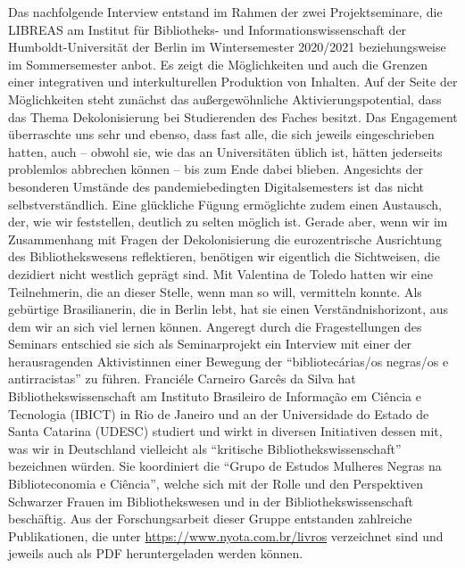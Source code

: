 \documentclass[a4paper,
fontsize=11pt,
oneside,
numbers=noperiodatend,
parskip=half-,
bibliography=totoc,
final
]{scrartcl}
\begin{document}
Das nachfolgende Interview entstand im Rahmen der zwei Projektseminare,
die LIBREAS am Institut für Bibliotheks- und Informationswissenschaft
der Humboldt-Universität der Berlin im Wintersemester 2020/2021
beziehungsweise im Sommersemester anbot. Es zeigt die Möglichkeiten und
auch die Grenzen einer integrativen und interkulturellen Produktion von
Inhalten. Auf der Seite der Möglichkeiten steht zunächst das
außergewöhnliche Aktivierungspotential, dass das Thema Dekolonisierung
bei Studierenden des Faches besitzt. Das Engagement überraschte uns sehr
und ebenso, dass fast alle, die sich jeweils eingeschrieben hatten, auch
-- obwohl sie, wie das an Universitäten üblich ist, hätten jederseits
problemlos abbrechen können -- bis zum Ende dabei blieben. Angesichts
der besonderen Umstände des pandemiebedingten Digitalsemesters ist das
nicht selbstverständlich. Eine glückliche Fügung ermöglichte zudem einen
Austausch, der, wie wir feststellen, deutlich zu selten möglich ist.
Gerade aber, wenn wir im Zusammenhang mit Fragen der Dekolonisierung die
eurozentrische Ausrichtung des Bibliothekswesens reflektieren, benötigen
wir eigentlich die Sichtweisen, die dezidiert nicht westlich geprägt
sind. Mit Valentina de Toledo hatten wir eine Teilnehmerin, die an
dieser Stelle, wenn man so will, vermitteln konnte. Als gebürtige
Brasilianerin, die in Berlin lebt, hat sie einen Verständnishorizont,
aus dem wir an sich viel lernen können. Angeregt durch die
Fragestellungen des Seminars entschied sie sich als Seminarprojekt ein
Interview mit einer der herausragenden Aktivistinnen einer Bewegung der
\enquote{bibliotecárias/os negras/os e antirracistas} zu führen.
Franciéle Carneiro Garcês da Silva hat Bibliothekswissenschaft am
Instituto Brasileiro de Informação em Ciência e Tecnologia (IBICT) in
Rio de Janeiro und an der Universidade do Estado de Santa Catarina
(UDESC) studiert und wirkt in diversen Initiativen dessen mit, was wir
in Deutschland vielleicht als \enquote{kritische
Bibliothekswissenschaft} bezeichnen würden. Sie koordiniert die
\enquote{Grupo de Estudos Mulheres Negras na Biblioteconomia e Ciência},
welche sich mit der Rolle und den Perspektiven Schwarzer Frauen im
Bibliothekswesen und in der Bibliothekswissenschaft beschäftig. Aus der
Forschungsarbeit dieser Gruppe entstanden zahlreiche Publikationen, die
unter \url{https://www.nyota.com.br/livros} verzeichnet sind und jeweils
auch als PDF heruntergeladen werden können.
\end{document}
